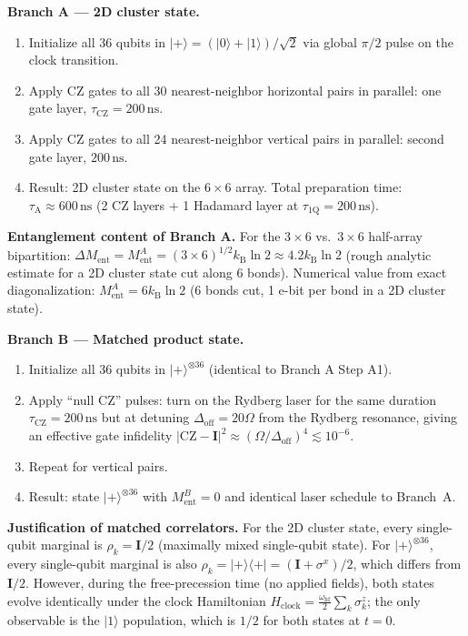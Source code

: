 \documentclass[12pt,letterpaper]{article}
\theoremstyle{plain}
\theoremstyle{definition}
\newcommand{\kB}{k_{\mathrm{B}}}
\begin{document}
\textbf{Branch A --- 2D cluster state.}
\begin{enumerate}[label=\textbf{Step A\arabic*.},leftmargin=3em,noitemsep]
\item Initialize all 36 qubits in $|+\rangle = (|0\rangle+|1\rangle)/\sqrt{2}$ via global $\pi/2$ pulse on the clock transition.
\item Apply CZ gates to all 30 nearest-neighbor horizontal pairs in parallel: one gate layer, $\tau_{\mathrm{CZ}} = 200\,\text{ns}$.
\item Apply CZ gates to all 24 nearest-neighbor vertical pairs in parallel: second gate layer, $200\,\text{ns}$.
\item Result: 2D cluster state on the $6\times6$ array. Total preparation time: $\tau_{\mathrm{A}} \approx 600\,\text{ns}$ (2 CZ layers + 1 Hadamard layer at $\tau_{\mathrm{1Q}} = 200\,\text{ns}$).
\end{enumerate}

\textbf{Entanglement content of Branch A.}
For the $3\times6$ vs.\ $3\times6$ half-array bipartition:
$\Delta M_{\mathrm{ent}} = M_{\mathrm{ent}}^A = (3\times6)^{1/2}\kB\ln 2 \approx 4.2\kB\ln 2$ (rough analytic estimate for a 2D cluster state cut along 6 bonds).  Numerical value from exact diagonalization: $M_{\mathrm{ent}}^A = 6\kB\ln 2$ (6 bonds cut, 1 e-bit per bond in a 2D cluster state).

\textbf{Branch B --- Matched product state.}
\begin{enumerate}[label=\textbf{Step B\arabic*.},leftmargin=3em,noitemsep]
\item Initialize all 36 qubits in $|+\rangle^{\otimes 36}$ (identical to Branch A Step A1).
\item Apply ``null CZ'' pulses: turn on the Rydberg laser for the same duration $\tau_{\mathrm{CZ}} = 200\,\text{ns}$ but at detuning $\Delta_{\mathrm{off}} = 20\Omega$ from the Rydberg resonance, giving an effective gate infidelity $|\mathrm{CZ} - \mathbf{I}|^2 \approx (\Omega/\Delta_{\mathrm{off}})^4 \lesssim 10^{-6}$.
\item Repeat for vertical pairs.
\item Result: state $|+\rangle^{\otimes 36}$ with $M_{\mathrm{ent}}^B = 0$ and identical laser schedule to Branch~A.
\end{enumerate}

\textbf{Justification of matched correlators.}
For the 2D cluster state, every single-qubit marginal is $\rho_k = \mathbf{I}/2$ (maximally mixed single-qubit state).  For $|+\rangle^{\otimes 36}$, every single-qubit marginal is also $\rho_k = |+\rangle\langle+| = (\mathbf{I}+\sigma^x)/2$, which differs from $\mathbf{I}/2$.  However, during the free-precession time (no applied fields), both states evolve identically under the clock Hamiltonian $H_{\mathrm{clock}} = \frac{\omega_{\mathrm{hf}}}{2}\sum_k\sigma^z_k$; the only observable is the $|1\rangle$ population, which is $1/2$ for both states at $t=0$.
\end{document}
